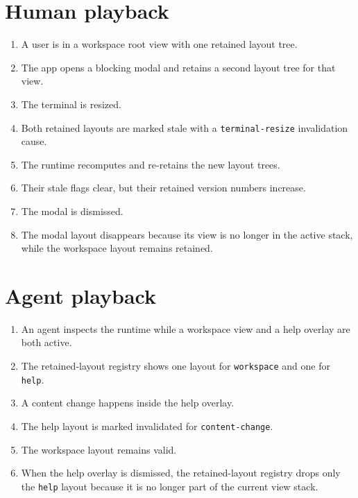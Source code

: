 \section{Human playback}\label{record-151-human-playback}

\begin{enumerate}
\def\labelenumi{\arabic{enumi}.}
\tightlist
\item
  A user is in a workspace root view with one retained layout tree.
\item
  The app opens a blocking modal and retains a second layout tree for that view.
\item
  The terminal is resized.
\item
  Both retained layouts are marked stale with a \texttt{t\allowbreak{}e\allowbreak{}r\allowbreak{}m\allowbreak{}i\allowbreak{}n\allowbreak{}a\allowbreak{}l\allowbreak{}-\allowbreak{}r\allowbreak{}e\allowbreak{}s\allowbreak{}i\allowbreak{}z\allowbreak{}e} invalidation cause.
\item
  The runtime recomputes and re-retains the new layout trees.
\item
  Their stale flags clear, but their retained version numbers increase.
\item
  The modal is dismissed.
\item
  The modal layout disappears because its view is no longer in the active stack, while the workspace layout remains retained.
\end{enumerate}

\section{Agent playback}\label{record-151-agent-playback}

\begin{enumerate}
\def\labelenumi{\arabic{enumi}.}
\tightlist
\item
  An agent inspects the runtime while a workspace view and a help overlay are both active.
\item
  The retained-layout registry shows one layout for \texttt{w\allowbreak{}o\allowbreak{}r\allowbreak{}k\allowbreak{}s\allowbreak{}p\allowbreak{}a\allowbreak{}c\allowbreak{}e} and one for \texttt{h\allowbreak{}e\allowbreak{}l\allowbreak{}p}.
\item
  A content change happens inside the help overlay.
\item
  The help layout is marked invalidated for \texttt{c\allowbreak{}o\allowbreak{}n\allowbreak{}t\allowbreak{}e\allowbreak{}n\allowbreak{}t\allowbreak{}-\allowbreak{}c\allowbreak{}h\allowbreak{}a\allowbreak{}n\allowbreak{}g\allowbreak{}e}.
\item
  The workspace layout remains valid.
\item
  When the help overlay is dismissed, the retained-layout registry drops only the \texttt{h\allowbreak{}e\allowbreak{}l\allowbreak{}p} layout because it is no longer part of the current view stack.
\end{enumerate}

